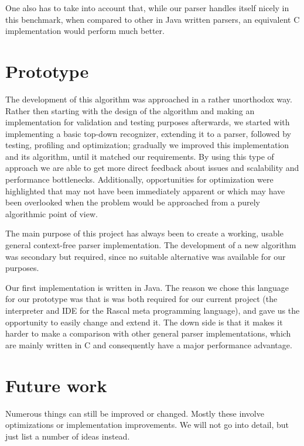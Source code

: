 \documentclass[a4paper,10pt]{article}
\begin{document}
One also has to take into account that, while our parser handles itself nicely in this benchmark, when compared to other in Java written parsers, an equivalent C implementation would perform much better.

\section{Prototype}

The development of this algorithm was approached in a rather unorthodox way. Rather then starting with the design of the algorithm and making an implementation for validation and testing purposes afterwards, we started with implementing a basic top-down recognizer, extending it to a parser, followed by testing, profiling and optimization; gradually we improved this implementation and its algorithm, until it matched our requirements. By using this type of approach we are able to get more direct feedback about issues and scalability and performance bottlenecks. Additionally, opportunities for optimization were highlighted that may not have been immediately apparent or which may have been overlooked when the problem would be approached from a purely algorithmic point of view.

The main purpose of this project has always been to create a working, usable general context-free parser implementation. The development of a new algorithm was secondary but required, since no suitable alternative was available for our purposes.

Our first implementation is written in Java. The reason we chose this language for our prototype was that is was both required for our current project (the interpreter and IDE for the Rascal meta programming language), and gave us the opportunity to easily change and extend it. The down side is that it makes it harder to make a comparison with other general parser implementations, which are mainly written in C and consequently have a major performance advantage.

\pagebreak
\section{Future work}

Numerous things can still be improved or changed. Mostly these involve optimizations or implementation improvements. We will not go into detail, but just list a number of ideas instead.
\end{document}

